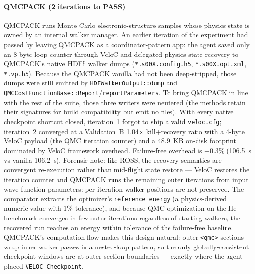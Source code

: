 \documentclass[conference]{IEEEtran}
\begin{document}
\paragraph{QMCPACK (2 iterations to PASS)}
QMCPACK runs Monte Carlo electronic-structure samples whose physics state is owned by an internal walker manager. An earlier iteration of the experiment had passed by leaving QMCPACK as a coordinator-pattern app: the agent saved only an 8-byte loop counter through VeloC and delegated physics-state recovery to QMCPACK's native HDF5 walker dumps (\texttt{*.s00X.config.h5}, \texttt{*.s00X.opt.xml}, \texttt{*.vp.h5}). Because the QMCPACK vanilla had not been deep-stripped, those dumps were still emitted by \texttt{HDFWalkerOutput::dump} and \texttt{QMCCostFunctionBase::Report}/\texttt{reportParameters}. To bring QMCPACK in line with the rest of the suite, those three writers were neutered (the methods retain their signatures for build compatibility but emit no files). With every native checkpoint shortcut closed, iteration~1 forgot to ship a valid \texttt{veloc.cfg}; iteration~2 converged at a Validation~B 1.04$\times$ kill+recovery ratio with a 4-byte VeloC payload (the QMC iteration counter) and a 48.9~KB on-disk footprint dominated by VeloC framework overhead. Failure-free overhead is +0.3\% (106.5~s vs vanilla 106.2~s). Forensic note: like ROSS, the recovery semantics are convergent re-execution rather than mid-flight state restore --- VeloC restores the iteration counter and QMCPACK runs the remaining outer iterations from input wave-function parameters; per-iteration walker positions are not preserved. The comparator extracts the optimizer's \texttt{reference energy} (a physics-derived numeric value with 1\% tolerance), and because QMC optimization on the He benchmark converges in few outer iterations regardless of starting walkers, the recovered run reaches an energy within tolerance of the failure-free baseline. QMCPACK's computation flow makes this design natural: outer \texttt{<qmc>} sections wrap inner walker passes in a nested-loop pattern, so the only globally-consistent checkpoint windows are at outer-section boundaries --- exactly where the agent placed \texttt{VELOC\_Checkpoint}.
\end{document}
